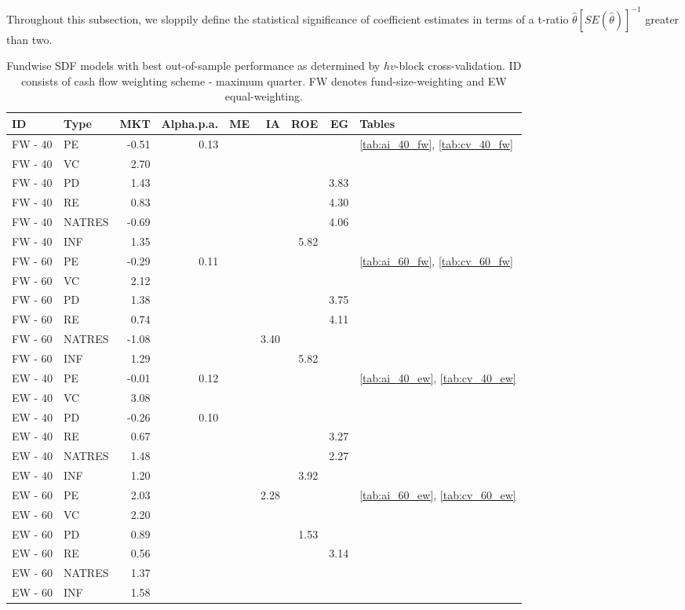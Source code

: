 \documentclass[12pt]{article}
\begin{document}
Throughout this subsection, we sloppily define the statistical significance of coefficient estimates in terms of a t-ratio $\hat{\theta}[SE(\hat{\theta})]^{-1}$ greater than two.


\begin{table}[ht]
	\centering
	\begin{tabular}{llrrrrrrl}
		ID & Type & MKT & Alpha.p.a. & ME & IA & ROE & EG & Tables \\ 
		\hline
		\hline
		FW - 40 & PE & -0.51 & 0.13 &  &  &  &  & \ref{tab:ai_40_fw}, \ref{tab:cv_40_fw} \\ 
		FW - 40 & VC & 2.70 &  &  &  &  &  &  \\ 
		FW - 40 & PD & 1.43 &  &  &  &  & 3.83 &  \\ 
		FW - 40 & RE & 0.83 &  &  &  &  & 4.30 &  \\ 
		FW - 40 & NATRES & -0.69 &  &  &  &  & 4.06 &  \\ 
		FW - 40 & INF & 1.35 &  &  &  & 5.82 &  &  \\ 
		\hline
		FW - 60 & PE & -0.29 & 0.11 &  &  &  &  & \ref{tab:ai_60_fw}, \ref{tab:cv_60_fw} \\ 
		FW - 60 & VC & 2.12 &  &  &  &  &  &  \\ 
		FW - 60 & PD & 1.38 &  &  &  &  & 3.75 &  \\ 
		FW - 60 & RE & 0.74 &  &  &  &  & 4.11 &  \\ 
		FW - 60 & NATRES & -1.08 &  &  & 3.40 &  &  &  \\ 
		FW - 60 & INF & 1.29 &  &  &  & 5.82 &  &  \\ 
		\hline
		\hline
		EW - 40 & PE & -0.01 & 0.12 &  &  &  &  & \ref{tab:ai_40_ew}, \ref{tab:cv_40_ew} \\ 
		EW - 40 & VC & 3.08 &  &  &  &  &  &  \\ 
		EW - 40 & PD & -0.26 & 0.10 &  &  &  &  &  \\ 
		EW - 40 & RE & 0.67 &  &  &  &  & 3.27 &  \\ 
		EW - 40 & NATRES & 1.48 &  &  &  &  & 2.27 &  \\ 
		EW - 40 & INF & 1.20 &  &  &  & 3.92 &  &  \\ 
		\hline
		EW - 60 & PE & 2.03 &  &  & 2.28 &  &  & \ref{tab:ai_60_ew}, \ref{tab:cv_60_ew} \\ 
		EW - 60 & VC & 2.20 &  &  &  &  &  &  \\ 
		EW - 60 & PD & 0.89 &  &  &  & 1.53 &  &  \\ 
		EW - 60 & RE & 0.56 &  &  &  &  & 3.14 &  \\ 
		EW - 60 & NATRES & 1.37 &  &  &  &  &  &  \\ 
		EW - 60 & INF & 1.58 &  &  &  &  &  &  \\ 
		\hline
		\hline
	\end{tabular}
	\caption{Fundwise SDF models with best out-of-sample performance as determined by $hv$-block cross-validation. ID consists of cash flow weighting scheme - maximum quarter. FW denotes fund-size-weighting and EW equal-weighting.} 
	\label{tab:result_summary}
\end{table}
\end{document}
